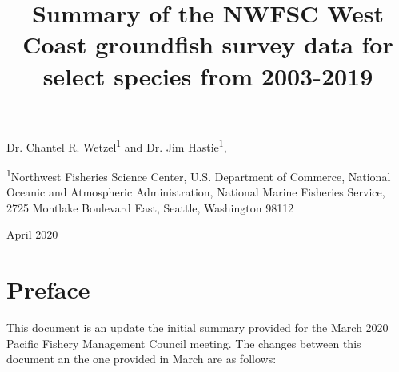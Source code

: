 \documentclass[12pt,]{article}
\title{Summary of the NWFSC West Coast groundfish survey data for
select species from 2003-2019}
\author{}
\date{}
\begin{document}
\maketitle


\begin{center}
\thispagestyle{empty}

\vspace{.5cm}


Dr. Chantel R. Wetzel\textsuperscript{1} and Dr. Jim Hastie\textsuperscript{1}, \\


\vspace{.5cm}

\small
\textsuperscript{1}Northwest Fisheries Science Center, U.S. Department of Commerce, National Oceanic and Atmospheric Administration, National Marine Fisheries Service, 2725 Montlake Boulevard East, Seattle, Washington 98112\\



\vspace{1.5cm}


\vfill
April 2020

\vspace{1cm}


\vspace{.3cm}

\end{center}

\newpage



\maketitle


\setcounter{page}{1}




{
\setcounter{tocdepth}{4}
\tableofcontents
}
\setlength{\parskip}{5mm plus1mm minus1mm}
\pagebreak

\setcounter{page}{1}


\hypertarget{preface}{%
\section{Preface}\label{preface}}

This document is an update the initial summary provided for the March
2020 Pacific Fishery Management Council meeting. The changes between
this document an the one provided in March are as follows:
\end{document}
